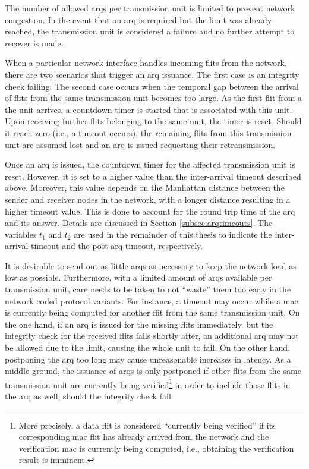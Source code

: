 The number of allowed \glspl{arq} per transmission unit is limited to prevent network congestion. In the event that an \gls{arq} is required but the limit
was already reached, the transmission unit is considered a failure and no further attempt to recover is made.

When a particular network interface handles incoming flits from the network, there are two scenarios that trigger an \gls{arq} issuance. The first
case is an integrity check failing. The second case occurs when the temporal gap between the arrival of flits from the same transmission unit becomes
too large. As the first flit from a the unit arrives, a countdown timer is started that is associated with this unit. Upon receiving further flits
belonging to the same unit, the timer is reset. Should it reach zero (i.e., a timeout occurs), the remaining flits from this transmission unit are
assumed lost and an \gls{arq} is issued requesting their retransmission.

Once an \gls{arq} is issued, the countdown timer for the affected transmission unit is reset. However, it is set to a higher value than the
inter-arrival timeout described above. Moreover, this value depends on the Manhattan distance between the sender and receiver nodes in the network,
with a longer distance resulting in a higher timeout value. This is done to account for the round trip time of the \gls{arq} and its
answer. Details are discussed in Section \ref{subsec:arqtimeouts}. The variables $t_1$ and $t_2$ are used in the remainder of this thesis to indicate
the inter-arrival timeout and the post-\gls{arq} timeout, respectively.

It is desirable to send out as little \glspl{arq} as necessary to keep the network load as low as possible. Furthermore, with a limited
amount of \glspl{arq} available per transmission unit, care needs to be taken to not \enquote{waste} them too early in the network coded protocol
variants. For instance, a timeout may
occur while a \gls{mac} is currently being computed for another flit from the same transmission unit. On the one hand, if an \gls{arq} is issued for
the missing flits immediately, but the integrity check for the received flits fails shortly after, an additional \gls{arq} may not be allowed due to
the limit, causing the whole unit to fail. On the other hand, postponing the \gls{arq} too long may cause unreasonable increases in latency. As a
middle ground, the issuance of \glspl{arq} is only postponed if other flits from the same transmission unit are currently being verified\footnote{More
precisely, a data flit is considered \enquote{currently being verified} if its corresponding \gls{mac} flit has already arrived from the network and
the verification \gls{mac} is currently being computed, i.e., obtaining the verification result is imminent.} in order to include those flits in the
\gls{arq} as well, should the integrity check fail.

